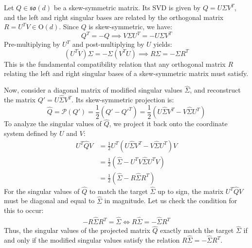 Let $Q \in \mathfrak{so}(d)$ be a skew-symmetric matrix. Its SVD is given by $Q = U \Sigma V^T$, and the left and right singular bases are related by the orthogonal matrix $R = U^T V \in \mathrm{O}(d)$. Since $Q$ is skew-symmetric, we have:
\begin{equation}
Q^T = -Q \implies V \Sigma U^T = -U \Sigma V^T
\end{equation}
Pre-multiplying by $U^T$ and post-multiplying by $U$ yields:
\begin{equation}
(U^T V) \Sigma = -\Sigma (V^T U) \implies R \Sigma = -\Sigma R^T
\end{equation}
This is the fundamental compatibility relation that any orthogonal matrix $R$ relating the left and right singular bases of a skew-symmetric matrix must satisfy.

Now, consider a diagonal matrix of modified singular values $\hat{\Sigma}$, and reconstruct the matrix $Q' = U \hat{\Sigma} V^T$. Its skew-symmetric projection is:
\begin{equation}
\hat{Q} = \mathcal{P}(Q') = \frac{1}{2}(Q' - Q'^T) = \frac{1}{2}(U \hat{\Sigma} V^T - V \hat{\Sigma} U^T)
\end{equation}
To analyze the singular values of $\hat{Q}$, we project it back onto the coordinate system defined by $U$ and $V$:
\begin{align}
U^T \hat{Q} V &= \frac{1}{2} U^T (U \hat{\Sigma} V^T - V \hat{\Sigma} U^T) V \\
&= \frac{1}{2} (\hat{\Sigma} - U^T V \hat{\Sigma} U^T V) \\
&= \frac{1}{2} (\hat{\Sigma} - R \hat{\Sigma} R^T)
\end{align}
For the singular values of $\hat{Q}$ to match the target $\hat{\Sigma}$ up to sign, the matrix $U^T \hat{Q} V$ must be diagonal and equal to $\hat{\Sigma}$ in magnitude. Let us check the condition for this to occur:
\begin{align}
- R \hat{\Sigma} R^T = \hat{\Sigma} \iff R \hat{\Sigma} = -\hat{\Sigma} R^T
\end{align}
Thus, the singular values of the projected matrix $\hat{Q}$ exactly match the target $\hat{\Sigma}$ if and only if the modified singular values satisfy the relation $R \hat{\Sigma} = -\hat{\Sigma} R^T$.

